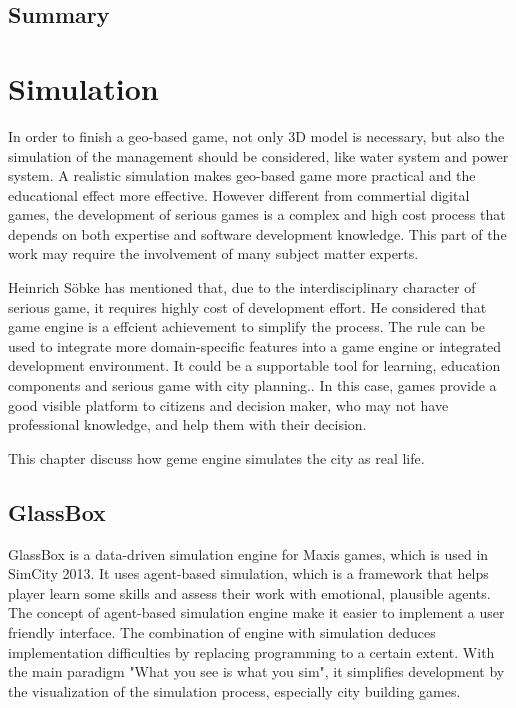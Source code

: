 \section{Summary}

\chapter{Simulation}

In order to finish a geo-based game, not only 3D model is necessary, but also the simulation of the management should be considered, like water system and power system. A realistic simulation makes geo-based game more practical and the educational effect more effective. However different from commertial digital games, the development of serious games is a complex and high cost process that depends on both expertise and software development knowledge. This part of the work may require the involvement of many subject matter experts. 

Heinrich Söbke has mentioned that, due to the interdisciplinary character of serious game, it requires highly cost of development effort. He considered that game engine is a effcient achievement to simplify the process. The rule can be used to integrate more domain-specific features into a game engine or integrated development environment. It could be a supportable tool for learning, education components and serious game with city planning.\cite{sobke2016serious}. In this case, games provide a good visible platform to citizens and decision maker, who may not have professional knowledge, and help them with their decision.

This chapter discuss how geme engine simulates the city as real life. 

\section{GlassBox}

GlassBox is a data-driven simulation engine for Maxis games, which is used in SimCity 2013. It uses agent-based simulation, which is a framework that helps player learn some skills and assess their work with emotional, plausible agents. The concept of agent-based simulation engine make it easier to implement a user friendly interface. The combination of engine with simulation deduces implementation difficulties by replacing programming to a certain extent. With the main paradigm "What you see is what you sim", it simplifies development by the visualization of the simulation process, especially city building games. 

